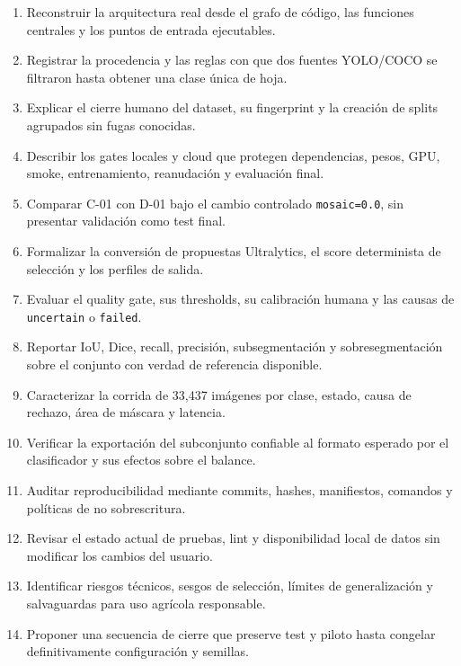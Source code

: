 \documentclass[11pt,a4paper]{article}
\begin{document}
\begin{enumerate}

\item Reconstruir la arquitectura real desde el grafo de código, las funciones centrales y los puntos de entrada ejecutables.

\item Registrar la procedencia y las reglas con que dos fuentes YOLO/COCO se filtraron hasta obtener una clase única de hoja.

\item Explicar el cierre humano del dataset, su fingerprint y la creación de splits agrupados sin fugas conocidas.

\item Describir los gates locales y cloud que protegen dependencias, pesos, GPU, smoke, entrenamiento, reanudación y evaluación final.

\item Comparar C-01 con D-01 bajo el cambio controlado \texttt{mosaic=0.0}, sin presentar validación como test final.

\item Formalizar la conversión de propuestas Ultralytics, el score determinista de selección y los perfiles de salida.

\item Evaluar el quality gate, sus thresholds, su calibración humana y las causas de \texttt{uncertain} o \texttt{failed}.

\item Reportar IoU, Dice, recall, precisión, subsegmentación y sobresegmentación sobre el conjunto con verdad de referencia disponible.

\item Caracterizar la corrida de 33,437 imágenes por clase, estado, causa de rechazo, área de máscara y latencia.

\item Verificar la exportación del subconjunto confiable al formato esperado por el clasificador y sus efectos sobre el balance.

\item Auditar reproducibilidad mediante commits, hashes, manifiestos, comandos y políticas de no sobrescritura.

\item Revisar el estado actual de pruebas, lint y disponibilidad local de datos sin modificar los cambios del usuario.

\item Identificar riesgos técnicos, sesgos de selección, límites de generalización y salvaguardas para uso agrícola responsable.

\item Proponer una secuencia de cierre que preserve test y piloto hasta congelar definitivamente configuración y semillas.

\end{enumerate}
\end{document}
